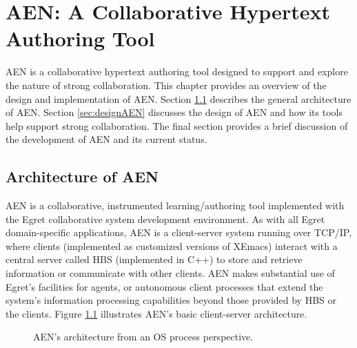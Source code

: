 

\newpage

\chapter{AEN: A Collaborative Hypertext Authoring Tool}
\label{sec:AEN}

AEN is a collaborative hypertext authoring tool designed to support and
explore the nature of strong collaboration.  This chapter provides an
overview of the design and implementation of AEN.  Section
\ref{sec:architectureAEN} describes the general architecture of AEN.
Section \ref{sec:designAEN} discusses the design of AEN and how its tools
help support strong collaboration.  The final section provides a brief
discussion of the development of AEN and its current status.

\section{Architecture of AEN}
\label{sec:architectureAEN}

AEN is a collaborative, instrumented learning/authoring tool implemented
with the Egret collaborative system development
environment\cite{csdl-93-09}.  As with all Egret domain-specific
applications, AEN is a client-server system running over TCP/IP, where
clients (implemented as customized versions of XEmacs) interact with a
central server called HBS (implemented in C++) to store and retrieve
information or communicate with other clients.  AEN makes substantial use
of Egret's facilities for agents, or autonomous client processes that
extend the system's information processing capabilities beyond those
provided by HBS or the clients.  Figure \ref{fig:aen-architecture}
illustrates AEN's basic client-server architecture.

\begin{figure}[htb]
  \centerline{} 
  {}
 \caption{AEN's architecture from an OS process perspective.}
\label{fig:aen-architecture}
\end{figure}

